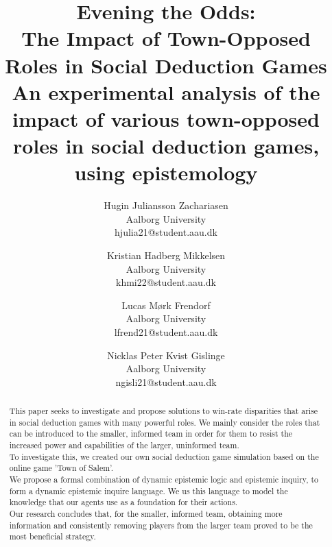 \documentclass[twocolumn]{article}
\begin{document}

\title{Evening the Odds:\\ The Impact of Town-Opposed Roles in Social Deduction 
Games\\ \small An experimental analysis of the impact of various 
town-opposed roles in social deduction games, using epistemology}
\author{
	Hugin Juliansson Zachariasen \\ Aalborg University \\ hjulia21@student.aau.dk
	\and
	Kristian Hadberg Mikkelsen \\ Aalborg University \\ khmi22@student.aau.dk
	\and
	Lucas Mørk Frendorf \\ Aalborg University \\ lfrend21@student.aau.dk
	\and
	Nicklas Peter Kvist Gislinge \\ Aalborg University \\ ngisli21@student.aau.dk
}
\maketitle
\begin{abstract}
This paper seeks to investigate and propose solutions to win-rate disparities that arise in social deduction games with many powerful roles. We mainly consider the roles that can be introduced to the smaller, informed team in order for them to resist the increased power and capabilities of the larger, uninformed team.\\ 
To investigate this, we created our own social deduction game simulation based on the online game 'Town of Salem'.\\ 
We propose a formal combination of dynamic epistemic logic and epistemic inquiry, to form a dynamic epistemic inquire language. We us this language to model the knowledge that our agents use as a foundation for their actions.\\ 
Our research concludes that, for the smaller, informed team, obtaining more information and consistently removing players from the larger team proved to be the most beneficial strategy.
\end{abstract}











\clearpage
\appendix
\makeatletter
\def\@seccntformat#1{\appendixname\ \csname the#1\endcsname: }
\makeatother




\clearpage
\printbibliography[heading=bibintoc, title=Bibliography]
\label{bib:mybiblio}
\end{document}
